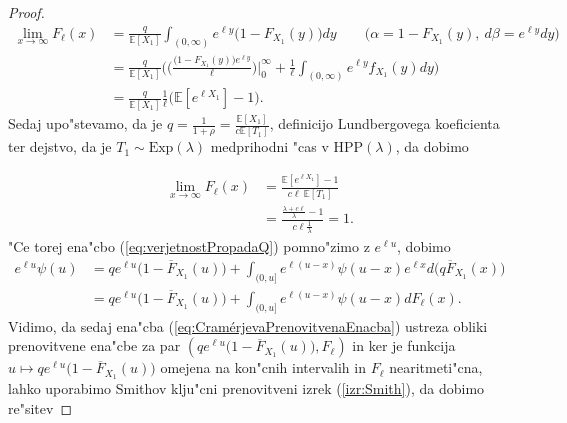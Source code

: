 \documentclass[12pt, a4paper, reqno]{amsart}
\theoremstyle{definition}
\theoremstyle{plain}
\newcommand{\E}{\mathbb{E}}
\newcommand{\1}{\mathds{1}}
\begin{document}
\begin{proof}
                \begin{align*}
                    \lim_{x\to\infty}F_\ell(x) &= \frac{q}{\E\left[X_1\right]}\int_{(0, \infty)}e^{\ell y} \bigl(1 - F_{X_1}(y)\bigr)dy \qquad \bigl(\alpha = 1 - F_{X_1}(y), \ d\beta = e^{\ell y}dy\bigr)\\
                                               &= \frac{q}{\E\left[X_1\right]}\biggl(\biggl(\frac{\bigl(1 - F_{X_1}(y)\bigr)e^{\ell y}}{\ell}\biggr)\Big|_{0}^{\infty} + \frac{1}{\ell}\int_{(0, \infty)}e^{\ell y}f_{X_1}(y)dy\biggr) \\
                                               &= \frac{q}{\E\left[X_1\right]}\frac{1}{\ell}\biggl(\E\left[e^{\ell X_1}\right] - 1\biggr).
                \end{align*}
                Sedaj upo"stevamo, da je $q = \frac{1}{1 + \rho} = \frac{\E\left[X_1\right]}{c\E\left[T_1\right]}$, 
                definicijo Lundbergovega koeficienta ter dejstvo, da je $T_1\sim\text{Exp}(\lambda)$ medprihodni "cas v $\text{HPP}(\lambda)$, da dobimo

                \begin{align*}
                    \lim_{x\to\infty}F_\ell(x)  &= \frac{\E\left[e^{\ell X_1}\right] - 1}{c\ell\ \E\left[T_1\right]}\\
                                                &= \frac{\frac{\lambda + c\ell}{\lambda} - 1}{c\ell \frac{1}{\lambda}} = 1.
                \end{align*}
                "Ce torej ena"cbo (\ref{eq:verjetnostPropadaQ}) pomno"zimo z $e^{\ell u}$, dobimo
                \begin{align}
                    e^{\ell u}\psi(u)   &= qe^{\ell u}\bigl(1 - \overline{F}_{X_1}(u)\bigr) + \int_{(0, u]}e^{\ell (u - x)}\psi(u - x)e^{\ell x}d\bigl(q\overline{F}_{X_1}(x)\bigr) \nonumber \\
                                        &= qe^{\ell u}\bigl(1 - \overline{F}_{X_1}(u)\bigr) + \int_{(0, u]}e^{\ell (u - x)}\psi(u - x)dF_\ell(x). \label{eq:CramérjevaPrenovitvenaEnacba}
                \end{align}
                Vidimo, da sedaj ena"cba (\ref{eq:CramérjevaPrenovitvenaEnacba}) ustreza obliki prenovitvene ena"cbe za par \newline $\left(qe^{\ell u}\bigl(1 - \overline{F}_{X_1}(u)\bigr), F_\ell\right)$
                in ker je funkcija $u\mapsto qe^{\ell u}\bigl(1 - \overline{F}_{X_1}(u)\bigr)$ omejena na kon"cnih 
                intervalih in $F_\ell$ nearitmeti"cna, lahko uporabimo Smithov klju"cni prenovitveni izrek (\ref{izr:Smith}), da dobimo
                re"sitev
                

\end{proof}
\end{document}
